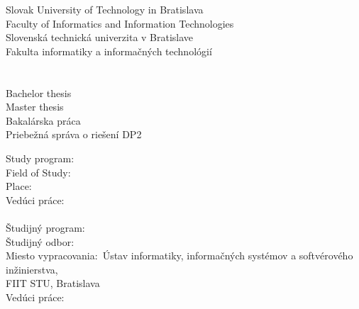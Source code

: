 \begin{center}
\thispagestyle{empty}
{
	{\Large Slovak University of Technology in Bratislava}\textbf{}\\
	{\Large Faculty of Informatics and Information Technologies}\textbf{}\\[\baselineskip]
}
{
	{\Large Slovenská technická univerzita v Bratislave}\textbf{}\\
	{\Large Fakulta informatiky a informačných technológií}\textbf{}\\[\baselineskip]
}
\vspace*{6.5cm}
{\Large \Author}\textbf{}\\[\baselineskip]
{\huge \Title}\textbf{}\\[\baselineskip]
{
	{
		{\large Bachelor thesis}\\
	}
	{
		{\large Master thesis}\\
	}
}
{
	{
		{\large Bakalárska práca}\\
	}
	{
		{\large Priebežná správa o riešení DP2}\\
	}
}
\end{center}
\vspace*{6cm}
{
	Study program: \Program\\
	Field of Study: \Field\\
	Place: \Place\\
	Vedúci práce: \Supervisor \\\\
}
{
	Študijný program:~~~~~~~\Program\\
	Študijný odbor:~~~~~~~~~~~\Field\\
	Miesto vypracovania:~Ústav informatiky, informačných systémov a softvérového inžinierstva,\\
	\hspace*{3.8cm}FIIT STU, Bratislava\\
	Vedúci práce:~~~~~~~~~~~~~~\Supervisor \\\\
}
\Month \Year
\afterpage{\blankpage}
